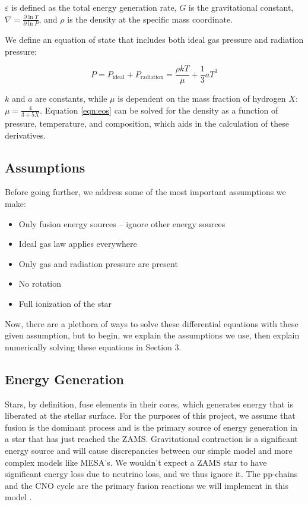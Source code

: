 \documentclass[twocolumn]{aastex631}
\begin{document}
$\varepsilon$ is defined as the total energy generation rate, $G$ is the gravitational constant, $\nabla = \frac{\partial \ln{T}}{\partial \ln{P}}$, and $\rho$ is the density at the specific mass coordinate.

We define an equation of state that includes both ideal gas pressure and radiation pressure:

\begin{equation}
	\label{eqn:eos}
	P = P_\text{ideal} + P_\text{radiation} = \frac{\rho k T}{\mu} + \frac{1}{3}aT^3
\end{equation}

$k$ and $a$ are constants, while $\mu$ is dependent on the mass fraction of hydrogen $X$: $\mu = \frac{4}{3 + 5X}$. Equation \ref{eqn:eos} can be solved for the density as a function of pressure, temperature, and composition, which aids in the calculation of these derivatives. 

\subsection{Assumptions}

Before going further, we address some of the most important assumptions we make:
\begin{itemize}
	\item Only fusion energy sources -- ignore other energy sources
	\item Ideal gas law applies everywhere
	\item Only gas and radiation pressure are present
	\item No rotation
	\item Full ionization of the star
\end{itemize}



Now, there are a plethora of ways to solve these differential equations with these given assumption, but to begin, we explain the assumptions we use, then explain numerically solving these equations in Section 3. 


\subsection{Energy Generation}

Stars, by definition, fuse elements in their cores, which generates energy that is liberated at the stellar surface. For the purposes of this project, we assume that fusion is the dominant process and is the primary source of energy generation in a star that has just reached the ZAMS. Gravitational contraction is a significant energy source and will cause discrepancies between our simple model and more complex models like MESA's. We wouldn't expect a ZAMS star to have significant energy loss due to neutrino loss, and we thus ignore it. The pp-chains and the CNO cycle are the primary fusion reactions we will implement in this model \citep{stelstrucev}. 
\end{document}
